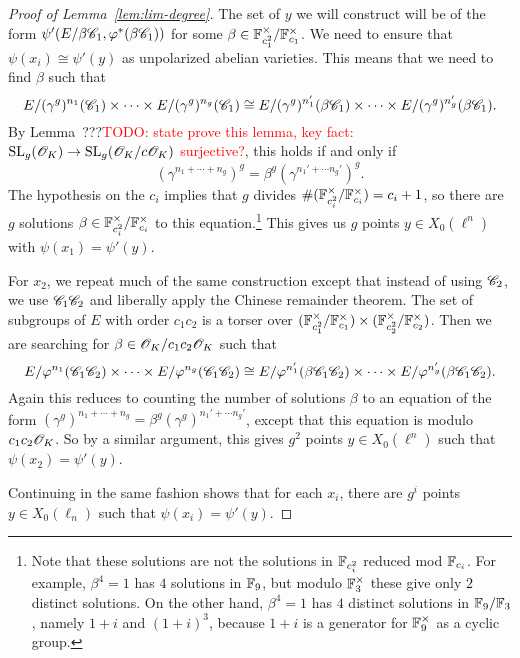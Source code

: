 \documentclass{amsart}
\begin{document}
\begin{proof}[Proof of Lemma~\ref{lem:lim-degree}]
  The set of $y$ we will construct will be of the form $\psi'(E/\beta\mathscr{C}_1,\varphi^{\ast}(\beta\mathscr{C}_1))$ for some $\beta \in \mathbb{F}_{c_1^2}^\times/\mathbb{F}_{c_1}^\times$. We need to ensure that $\psi(x_i) \cong \psi'(y)$ as unpolarized abelian varieties. This means that we need to find $\beta$ such that
  \[
    E/(\gamma^g)^{n_1}(\mathscr{C}_1) \times \cdots \times E/(\gamma^g)^{n_g}(\mathscr{C}_1)
    \cong
    E/(\gamma^g)^{n_1'}(\beta\mathscr{C}_1) \times \cdots \times E/(\gamma^g)^{n_g'}(\beta\mathscr{C}_1).
  \]
  By Lemma~???\textcolor{red}{TODO: state prove this lemma, key fact: $\operatorname{SL}_g(\mathscr{O}_K) \to \operatorname{SL}_g(\mathscr{O}_K/c\mathscr{O}_K)$ surjective?}, this holds if and only if
  \[
    (\gamma^{n_1 + \cdots + n_g})^g = \beta^g(\gamma^{n_1' + \cdots n_g'})^g.
  \]
  The hypothesis on the $c_i$ implies that $g$ divides $\#(\mathbb{F}_{c_i^2}^\times/\mathbb{F}_{c_i}^\times) = c_i + 1$, so there are $g$ solutions $\beta \in \mathbb{F}_{c_i^2}^\times/\mathbb{F}_{c_i}^\times$ to this equation.\footnote{Note that these solutions are not the solutions in $\mathbb{F}_{c_i^2}$ reduced mod $\mathbb{F}_{c_i}$. For example, $\beta^4 = 1$ has $4$ solutions in $\mathbb{F}_9$, but modulo $\mathbb{F}_3^\times$ these give only $2$ distinct solutions. On the other hand, $\beta^4 = 1$ has $4$ distinct solutions in $\mathbb{F}_9/\mathbb{F}_3$, namely $1+i$ and $(1+i)^3$, because $1+i$ is a generator for $\mathbb{F}_9^\times$ as a cyclic group.} This gives us $g$ points $y \in X_0(\ell^n)$ with $\psi(x_1) = \psi'(y)$.

  For $x_2$, we repeat much of the same construction except that instead of using $\mathscr{C}_2$, we use $\mathscr{C}_1\mathscr{C}_2$ and liberally apply the Chinese remainder theorem. The set of subgroups of $E$ with order $c_1c_2$ is a torser over $(\mathbb{F}_{c_1^2}^\times/\mathbb{F}_{c_1}^\times) \times (\mathbb{F}_{c_2^2}^\times/\mathbb{F}_{c_2}^\times)$. Then we are searching for $\beta \in \mathscr{O}_K/c_1c_2\mathscr{O}_K$ such that
  \[
    E/\varphi^{n_1}(\mathscr{C}_1\mathscr{C}_2) \times \cdots \times E/\varphi^{n_g}(\mathscr{C}_1\mathscr{C}_2)
    \cong
    E/\varphi^{n_1'}(\beta\mathscr{C}_1\mathscr{C}_2) \times \cdots \times E/\varphi^{n_g'}(\beta\mathscr{C}_1\mathscr{C}_2).
  \]
  Again this reduces to counting the number of solutions $\beta$ to an equation of the form $(\gamma^{g})^{n_1 + \cdots + n_g} = \beta^g(\gamma^g)^{n_1' + \cdots n_g'}$, except that this equation is modulo $c_1c_2\mathscr{O}_K$. So by a similar argument, this gives $g^2$ points $y \in X_0(\ell^n)$ such that $\psi(x_2) = \psi'(y)$.

  Continuing in the same fashion shows that for each $x_i$, there are $g^i$ points $y \in X_0(\ell_n)$ such that $\psi(x_i) = \psi'(y)$.
\end{proof}
\end{document}
